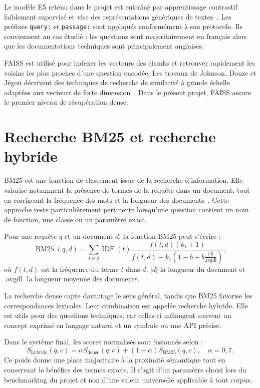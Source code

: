 \documentclass[12pt,a4paper,oneside]{report}
\begin{document}
Le modèle E5 retenu dans le projet est entraîné par apprentissage contrastif
faiblement supervisé et vise des représentations génériques de textes~\cite{wange5}.
Les préfixes \texttt{query:} et \texttt{passage:} sont appliqués conformément à
son protocole. Ils conviennent au cas étudié : les questions sont majoritairement
en français alors que les documentations techniques sont principalement anglaises.

FAISS est utilisé pour indexer les vecteurs des chunks et retrouver rapidement
les voisins les plus proches d'une question encodée. Les travaux de Johnson,
Douze et Jégou décrivent des techniques de recherche de similarité à grande
échelle adaptées aux vecteurs de forte dimension~\cite{johnson2017faiss}. Dans
le présent projet, FAISS assure le premier niveau de récupération dense.

\section{Recherche BM25 et recherche hybride}

BM25 est une fonction de classement issue de la recherche d'information. Elle
valorise notamment la présence de termes de la requête dans un document, tout en
corrigeant la fréquence des mots et la longueur des documents~\cite{robertson2009bm25}.
Cette approche reste particulièrement pertinente lorsqu'une question contient
un nom de fonction, une classe ou un paramètre exact.

Pour une requête $q$ et un document $d$, la fonction BM25 peut s'écrire :
\[
\operatorname{BM25}(q,d)=\sum_{t\in q}\operatorname{IDF}(t)
\frac{f(t,d)(k_1+1)}{f(t,d)+k_1\left(1-b+b\frac{|d|}{\operatorname{avgdl}}\right)},
\]
où $f(t,d)$ est la fréquence du terme $t$ dans $d$, $|d|$ la longueur du
document et $\operatorname{avgdl}$ la longueur moyenne des documents.

La recherche dense capte davantage le sens général, tandis que BM25 favorise
les correspondances lexicales. Leur combinaison est appelée recherche hybride.
Elle est utile pour des questions techniques, car celles-ci mélangent souvent
un concept exprimé en langage naturel et un symbole ou une API précise.

Dans le système final, les scores normalisés sont fusionnés selon :
\[
S_{\mathrm{hybride}}(q,c)=\alpha S_{\mathrm{dense}}(q,c)+(1-\alpha)S_{\mathrm{BM25}}(q,c),
\quad \alpha=0{,}7.
\]
Ce poids donne une place majoritaire à la proximité sémantique tout en conservant
le bénéfice des termes exacts. Il s'agit d'un paramètre choisi lors du
benchmarking du projet et non d'une valeur universelle applicable à tout corpus.
\end{document}
